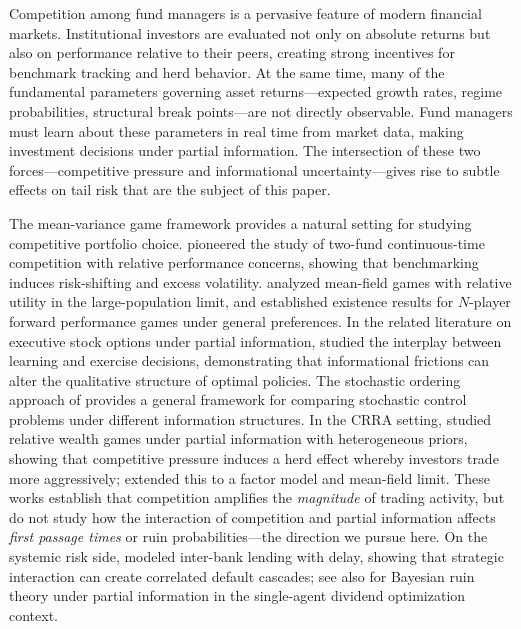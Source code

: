\documentclass[12pt]{article}
\theoremstyle{remark}
\theoremstyle{definition}
\begin{document}
Competition among fund managers is a pervasive feature of modern
financial markets.
Institutional investors are evaluated not only on absolute returns but
also on performance relative to their peers, creating strong incentives
for benchmark tracking and herd behavior.
At the same time, many of the fundamental parameters governing
asset returns---expected growth rates, regime probabilities, structural
break points---are not directly observable.
Fund managers must learn about these parameters in real time from market
data, making investment decisions under partial information.
The intersection of these two forces---competitive pressure and
informational uncertainty---gives rise to subtle effects on tail risk
that are the subject of this paper.

The mean-variance game framework provides a natural setting for
studying competitive portfolio choice.
\citet{BasakMakarov2014} pioneered the study of two-fund
continuous-time competition with relative performance concerns,
showing that benchmarking induces risk-shifting and excess volatility.
\citet{EspinosaTouzi2015} analyzed mean-field games with relative utility
in the large-population limit,
and \citet{LackerZariphopoulou2019} established existence results
for $N$-player forward performance games under general preferences.
In the related literature on executive stock options under partial
information, \citet{Henderson2020} studied the interplay between
learning and exercise decisions, demonstrating that informational
frictions can alter the qualitative structure of optimal policies.
The stochastic ordering approach of \citet{BaeuerleBayraktar2013}
provides a general framework for comparing stochastic control problems
under different information structures.
In the CRRA setting, \citet{Deng2022} studied relative wealth games
under partial information with heterogeneous priors, showing that
competitive pressure induces a herd effect whereby investors trade
more aggressively; \citet{ZhangYan2024} extended this to a factor
model and mean-field limit.
These works establish that competition amplifies the \emph{magnitude}
of trading activity, but do not study how the interaction of
competition and partial information affects \emph{first passage times}
or ruin probabilities---the direction we pursue here.
On the systemic risk side, \citet{Carmona2018} modeled inter-bank
lending with delay, showing that strategic interaction can create
correlated default cascades; see also \citet{Leobacher2016} for
Bayesian ruin theory under partial information in the single-agent
dividend optimization context.
\end{document}
